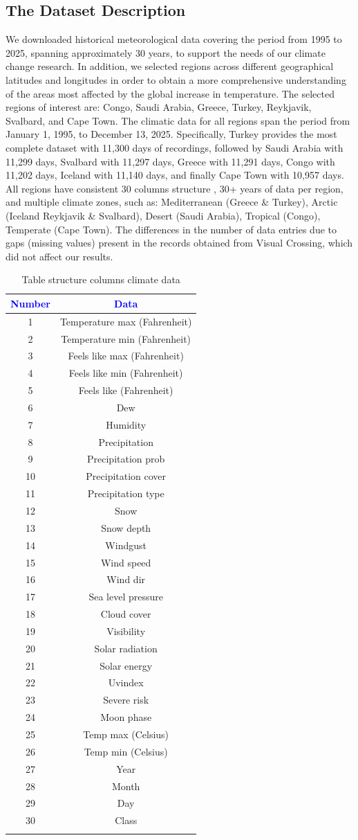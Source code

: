 \documentclass[12pt]{Definitions/academia}
\begin{document}
\subsection{\textmd{The Dataset Description}}
\vspace{-4em}
We downloaded historical meteorological data covering the period from
1995 to 2025, spanning approximately 30 years, to support the needs
of our climate change research. In addition, we selected regions across
different geographical latitudes and longitudes in order to obtain
a more comprehensive understanding of the areas most affected by the
global increase in temperature. The selected regions of interest are:
Congo, Saudi Arabia, Greece, Turkey, Reykjavik, Svalbard, and Cape
Town. The climatic data for all regions span the period from January
1, 1995, to December 13, 2025. Specifically, Turkey provides the most
complete dataset with 11,300 days of recordings, followed by Saudi
Arabia with 11,299 days, Svalbard with 11,297 days, Greece with 11,291
days, Congo with 11,202 days, Iceland with 11,140 days, and finally
Cape Town with 10,957 days. All regions have consistent 30 columns
structure , 30+ years of data per
region, and multiple climate zones, such as: Mediterranean (Greece
\& Turkey), Arctic (Iceland Reykjavik \& Svalbard), Desert (Saudi
Arabia), Tropical (Congo), Temperate (Cape Town). The differences
in the number of data entries  due to gaps (missing values) present
in the records obtained from Visual Crossing, which did not affect
our results.

\begin{table}[H]
	\centering
\begin{tabular*}{10cm}{@{\extracolsep{\fill}}|c|c|}
\hline
\textbf{\textcolor{blue}{Number}} & \textbf{\textcolor{blue}{Data}}\tabularnewline
\hline
\hline
1 & Temperature max (Fahrenheit)\tabularnewline
\hline
2 & Temperature min (Fahrenheit)\tabularnewline
\hline
3 & Feels like max (Fahrenheit)\tabularnewline
\hline
4 & Feels like min (Fahrenheit)\tabularnewline
\hline
5 & Feels like (Fahrenheit)\tabularnewline
\hline
6 & Dew\tabularnewline
\hline
7 & Humidity\tabularnewline
\hline
8 & Precipitation\tabularnewline
\hline
9 & Precipitation prob\tabularnewline
\hline
10 & Precipitation cover\tabularnewline
\hline
11 & Precipitation type \tabularnewline
\hline
12 & Snow\tabularnewline
\hline
13 & Snow depth\tabularnewline
\hline
14 & Windgust\tabularnewline
\hline
15 & Wind speed\tabularnewline
\hline
16 & Wind dir\tabularnewline
\hline
17 & Sea level pressure\tabularnewline
\hline
18 & Cloud cover\tabularnewline
\hline
19 & Visibility\tabularnewline
\hline
20 & Solar radiation\tabularnewline
\hline
21 & Solar energy\tabularnewline
\hline
22 & Uvindex\tabularnewline
\hline
23 & Severe risk\tabularnewline
\hline
24 & Moon phase\tabularnewline
\hline
25 & Temp max (Celsius)\tabularnewline
\hline
26 & Temp min (Celsius)\tabularnewline
\hline
27 & Year\tabularnewline
\hline
28 & Month\tabularnewline
\hline
29 & Day\tabularnewline
\hline
30 & Class\tabularnewline
\hline
 & \tabularnewline
\hline
\end{tabular*}\caption{Table structure columns climate data\label{tab:Table-2-structure-columns}}
\end{table}
\end{document}
